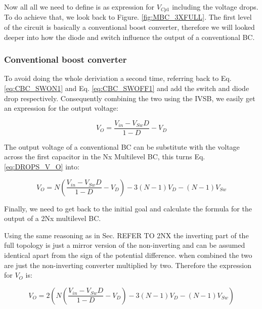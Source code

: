 Now all all we need to define is as expression for $V_{Cp1}$ including the voltage drops. To do achieve that, we look back to Figure. \ref{fig:MBC_3XFULL}. The first level of the circuit is basically a conventional boost converter, therefore we will looked deeper into how the diode and switch influence the output of a conventional BC. 

\subsubsection{Conventional boost converter}

To avoid doing the whole deriviation a second time, referring back to Eq. \ref{eq:CBC_SWON1} and Eq. \ref{eq:CBC_SWOFF1} and add the switch and diode drop respectively. Consequently combining the two using the IVSB, we easily get an expression for the output voltage: 

\begin{equation}
	V_{O}= \frac{V_{in}-V_{Sw}D}{1-D}-V_D
	\label{eq:DROPS_CONV}
\end{equation}

The output voltage of a conventional BC can be substitute with the voltage across the first capacitor in the Nx Multilevel BC, this turns Eq. \ref{eq:DROPS_V_O} into: 

\begin{equation}
	V_{O}= N( \frac{V_{in}-V_{Sw}D}{1-D}-V_D)-3(N-1)V_D-(N-1)V_{Sw} 
	\label{eq:DROPS_NX_FINAL}
\end{equation}

Finally, we need to get back to the initial goal and calculate the formula for the output of a 2Nx multilevel BC. 

Using the same reasoning as in Sec. REFER TO 2NX the inverting part of the full topology is just a mirror version of the non-inverting and can be assumed identical apart from the sign of the potential difference. when combined the two are just the non-inverting converter multiplied by two. Therefore the expression for $V_{O}$ is: 

\begin{equation}
	V_{O}= 2(N( \frac{V_{in}-V_{Sw}D}{1-D}-V_D)-3(N-1)V_D-(N-1)V_{Sw})
	\label{eq:DROPS_2INX_FINAL}
\end{equation}
